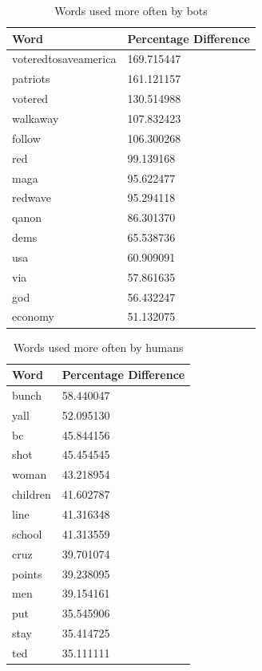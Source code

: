 \documentclass[letterpaper]{article}
\begin{document}
\begin{table}
    \centering
    \begin{tabular}{|l|l|}
    \hline
    \textbf{Word} & \textbf{Percentage Difference} \\ \hline
    voteredtosaveamerica & 169.715447 \\ \hline
    patriots & 161.121157 \\ \hline
    votered & 130.514988 \\ \hline
    walkaway & 107.832423 \\ \hline
    follow & 106.300268 \\ \hline
    red & 99.139168 \\ \hline
    maga & 95.622477 \\ \hline
    redwave & 95.294118 \\ \hline
    qanon & 86.301370 \\ \hline
    dems & 65.538736 \\ \hline
    usa & 60.909091 \\ \hline
    via & 57.861635 \\ \hline
    god & 56.432247 \\ \hline
    economy & 51.132075 \\ \hline
    \end{tabular}
    \caption{Words used more often by bots}
    \label{tab:bot-dominant-words}
\end{table}

\begin{table}
    \centering
    \begin{tabular}{|l|l|}
    \hline
    \textbf{Word} & \textbf{Percentage Difference} \\ \hline
    bunch & 58.440047 \\ \hline
    yall & 52.095130 \\ \hline
    bc & 45.844156 \\ \hline
    shot & 45.454545 \\ \hline
    woman & 43.218954 \\ \hline
    children & 41.602787 \\ \hline
    line & 41.316348 \\ \hline
    school & 41.313559 \\ \hline
    cruz & 39.701074 \\ \hline
    points & 39.238095 \\ \hline
    men & 39.154161 \\ \hline
    put & 35.545906 \\ \hline
    stay & 35.414725 \\ \hline
    ted & 35.111111 \\ \hline
    \end{tabular}
    \caption{Words used more often by humans}
    \label{tab:humans-dominant-words}
\end{table}
\end{document}
